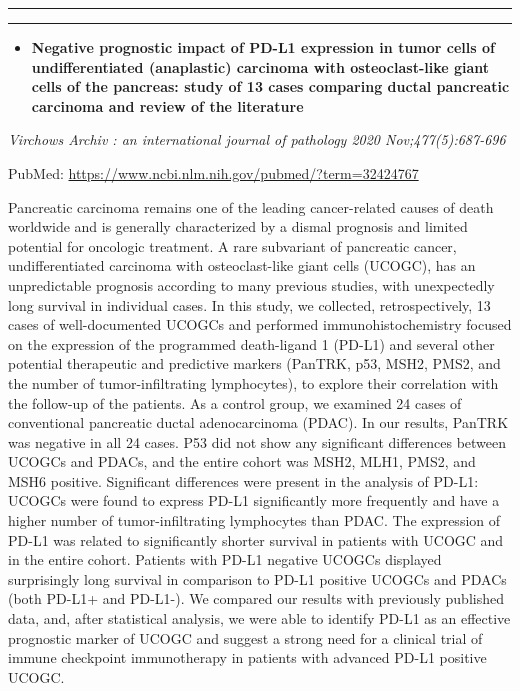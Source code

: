 \documentclass[
]{article}
\providecommand{\tightlist}{%
  \setlength{\itemsep}{0pt}\setlength{\parskip}{0pt}}
\begin{document}
\begin{center}\rule{0.5\linewidth}{0.5pt}\end{center}

\begin{center}\rule{0.5\linewidth}{0.5pt}\end{center}

\begin{itemize}
\tightlist
\item
  \textbf{Negative prognostic impact of PD-L1 expression in tumor cells
  of undifferentiated (anaplastic) carcinoma with osteoclast-like giant
  cells of the pancreas: study of 13 cases comparing ductal pancreatic
  carcinoma and review of the literature}
\end{itemize}

\emph{Virchows Archiv : an international journal of pathology 2020
Nov;477(5):687-696}

PubMed: \url{https://www.ncbi.nlm.nih.gov/pubmed/?term=32424767}

Pancreatic carcinoma remains one of the leading cancer-related causes of
death worldwide and is generally characterized by a dismal prognosis and
limited potential for oncologic treatment. A rare subvariant of
pancreatic cancer, undifferentiated carcinoma with osteoclast-like giant
cells (UCOGC), has an unpredictable prognosis according to many previous
studies, with unexpectedly long survival in individual cases. In this
study, we collected, retrospectively, 13 cases of well-documented UCOGCs
and performed immunohistochemistry focused on the expression of the
programmed death-ligand 1 (PD-L1) and several other potential
therapeutic and predictive markers (PanTRK, p53, MSH2, PMS2, and the
number of tumor-infiltrating lymphocytes), to explore their correlation
with the follow-up of the patients. As a control group, we examined 24
cases of conventional pancreatic ductal adenocarcinoma (PDAC). In our
results, PanTRK was negative in all 24 cases. P53 did not show any
significant differences between UCOGCs and PDACs, and the entire cohort
was MSH2, MLH1, PMS2, and MSH6 positive. Significant differences were
present in the analysis of PD-L1: UCOGCs were found to express PD-L1
significantly more frequently and have a higher number of
tumor-infiltrating lymphocytes than PDAC. The expression of PD-L1 was
related to significantly shorter survival in patients with UCOGC and in
the entire cohort. Patients with PD-L1 negative UCOGCs displayed
surprisingly long survival in comparison to PD-L1 positive UCOGCs and
PDACs (both PD-L1+ and PD-L1-). We compared our results with previously
published data, and, after statistical analysis, we were able to
identify PD-L1 as an effective prognostic marker of UCOGC and suggest a
strong need for a clinical trial of immune checkpoint immunotherapy in
patients with advanced PD-L1 positive UCOGC.
\end{document}
